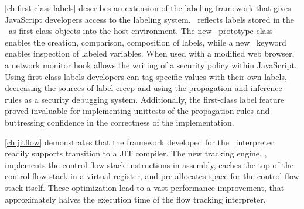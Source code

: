 \autoref{ch:first-class-labels} describes an extension of the labeling framework that gives JavaScript developers access to the labeling system.
\FlowCore\ reflects labels stored in the \FlowLabelRegistry\ as first-class objects into the host environment.
The new \FlowLabelObject\ prototype class enables the creation, comparison, composition of labels, while a new \mlabelof\ keyword enables inspection of labeled variables.
When used with a modified web browser, a network monitor hook allows the writing of a security policy within JavaScript.
Using first-class labels developers can tag specific values with their own labels, decreasing the sources of label creep and using the propagation and inference rules as a security debugging system.
Additionally, the first-class label feature proved invaluable for implementing unittests of the propagation rules and buttressing confidence in the correctness of the implementation.

\autoref{ch:jitflow} demonstrates that the framework developed for the \FlowCore\ interpreter readily supports transition to a JIT compiler.
The new tracking engine, \JitFlow, implements the control-flow stack instructions in assembly, caches the top of the control flow stack in a virtual register, and pre-allocates space for the control flow stack itself.
These optimization lead to a vast performance improvement, that approximately halves the execution time of the flow tracking interpreter.
